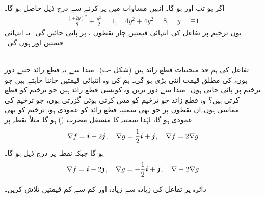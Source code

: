   اگر  ہو تب  اور  ہو گا۔ انہیں مساوات  میں پر کرنے سے درج ذیل حاصل ہو گا۔
\begin{align*}
\frac{(\mp 2y)^2}{8}+\frac{y^2}{2}=1,\quad 4y^2+4y^2=8,\quad y=\mp 1
\end{align*}
یوں ترخیم پر تفاعل  کی انتہائی قیمتیں چار نقطوں  ،  پر پائی جائیں گی۔ یہ انتہائی قیمتیں  اور  ہوں گی۔ 

\\
تفاعل  کی ہم قد منحنیات قطع زائد  ہیں (شکل -ب)۔ مبدا سے یہ قطع زائد جتنے دور ہوں،  کی مطلق قیمت اتنی بڑی ہو گی۔ ہم  کی وہ  انتہائی قیمتیں جاننا چاہتے ہیں جو ترخیم  پر پائی جاتی ہوں۔ مبدا سے دور ترین وہ کونسی قطع زائد ہیں  جو ترخیم کو قطع کرتی ہیں؟ وہ قطع زائد جو ترخیم کو مس کرتی  ہوئی گزرتی ہوں، جو ترخیم کی مماسی ہوں۔ان نقطوں پر جو بھی سمتیہ قطع زائد کو عمودی ہو، ترخیم کو بھی عمودی ہو گا، لہٰذا   سمتیہ  کا مستقل مضرب () ہو گا۔مثلاً  نقطہ  پر
\begin{align*}
\nabla f={\boldsymbol{i}}+2{\boldsymbol{j}},\quad \nabla g=\frac{1}{2}{\boldsymbol{i}}+{\boldsymbol{j}},\quad \nabla f=2\nabla g
\end{align*}
ہو گا  جبکہ  نقطہ  پر درج ذیل ہو گا۔
\begin{align*}
\nabla f={\boldsymbol{i}}-2{\boldsymbol{j}},\quad \nabla g=-\frac{1}{2}{\boldsymbol{i}}+{\boldsymbol{j}},\quad \nabla -2\nabla g
\end{align*}


دائرہ  پر تفاعل  کی زیادہ سے زیادہ اور کم سے کم قیمتیں تلاش کریں۔

